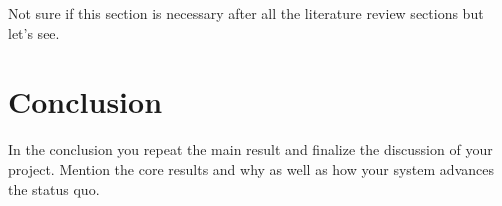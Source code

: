 \documentclass[a4paper,11pt,oneside]{report}
\begin{document}


Not sure if this section is necessary after all the literature review sections but let's see.

\chapter{Conclusion}

In the conclusion you repeat the main result and finalize the discussion of
your project. Mention the core results and why as well as how your system
advances the status quo.

\cleardoublepage
{}
{}
\printbibliography

%
%
\end{document}
